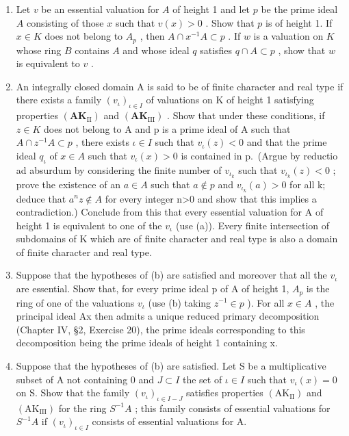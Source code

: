 \begin{enumerate}
\def\labelenumi{(\alph{enumi})}
\item
  Let \(v\) be an essential valuation for \(A\) of height 1 and let \(p\) be the prime ideal \(A\) consisting of those \(x\) such that \(v(x) > 0\) . Show that \(p\) is of height 1. If \(x \in K\) does not belong to \(A_p\) , then \(A \cap x^{-1}A \subset p\) . If \(w\) is a valuation on \(K\) whose ring \(B\) contains \(A\) and whose ideal \(q\) satisfies \(q \cap A \subset p\) , show that \(w\) is equivalent to \(v\) .
\item
  An integrally closed domain A is said to be of finite character and real type if there exists a family \((v_{\iota})_{\iota\in I}\) of valuations on K of height 1 satisfying properties \((\mathbf{AK}_{\mathrm{II}})\) and \((\mathbf{AK}_{\mathrm{III}})\) . Show that under these conditions, if \(z\in K\) does not belong to A and p is a prime ideal of A such that \(A\cap z^{-1}A\subset p\) , there exists \(\iota\in I\) such that \(v_{\iota}(z)<0\) and that the prime ideal \(q_{\iota}\) of \(x\in A\) such that \(v_{\iota}(x)>0\) is contained in p.~(Argue by reductio ad absurdum by considering the finite number of \(v_{\iota_{k}}\) such that \(v_{\iota_{k}}(z)<0\) ; prove the existence of an \(a\in A\) such that \(a\notin p\) and \(v_{\iota_{k}}(a)>0\) for all k; deduce that \(a^{n}z\notin A\) for every integer n\textgreater0 and show that this implies a contradiction.) Conclude from this that every essential valuation for A of height 1 is equivalent to one of the \(v_{\iota}\) (use (a)). Every finite intersection of subdomains of K which are of finite character and real type is also a domain of finite character and real type.
\item
  Suppose that the hypotheses of (b) are satisfied and moreover that all the \(v_{\iota}\) are essential. Show that, for every prime ideal p of A of height 1, \(A_{p}\) is the ring of one of the valuations \(v_{\iota}\) (use (b) taking \(z^{-1} \in p\) ). For all \(x \in A\) , the principal ideal Ax then admits a unique reduced primary decomposition (Chapter IV, §2, Exercise 20), the prime ideals corresponding to this decomposition being the prime ideals of height 1 containing x.
\item
  Suppose that the hypotheses of (b) are satisfied. Let S be a multiplicative subset of A not containing 0 and \(J \subset I\) the set of \(\iota \in I\) such that \(v_{\iota}(x) = 0\) on S. Show that the family \((v_{\iota})_{\iota \in I-J}\) satisfies properties \((\mathrm{AK}_{\mathrm{II}})\) and \((\mathrm{AK}_{\mathrm{III}})\) for the ring \(S^{-1}A\) ; this family consists of essential valuations for \(S^{-1}A\) if \((v_{\iota})_{\iota \in I}\) consists of essential valuations for A.

\end{enumerate}
